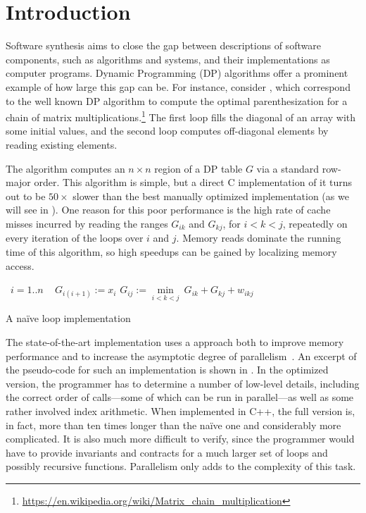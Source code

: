 \section{Introduction}
\label{intro}

\newcommand\ForLine[1]{\State\algorithmicfor~{#1} \algorithmicdo~}
\newcommand\Head[1]{\Comment{ {\it #1} ~~}}

Software synthesis aims to close the gap between descriptions of software components, such as algorithms and systems, and their implementations as computer programs. Dynamic Programming (DP) algorithms offer a prominent example of how large this gap can be. For instance, consider  
\cbstart{}%
, which correspond to the well known DP algorithm to compute the optimal parenthesization for a chain of matrix multiplications.\footnote{\fontsize{6}{6}\selectfont\url{https://en.wikipedia.org/wiki/Matrix_chain_multiplication}}
The first loop fills the diagonal of an array with some initial values,
and the second loop computes off-diagonal elements by reading existing elements.
\cbend

The algorithm computes an $n\times n$ region of a DP table $G$ via a standard row-major order. This algorithm is simple, but a direct C implementation of it turns out to be 
$50\times$ slower than the best manually optimized implementation \cbstart(as we will see in )\cbend. 
One reason for this poor performance is the high rate of cache misses incurred by reading the ranges $G_{ik}$ and $G_{kj}$, for $i<k<j$, repeatedly on every iteration of the loops over $i$ and $j$. Memory reads dominate the running time of this algorithm, so high speedups can be gained by localizing memory access.


\begin{algorithm}[t]
\renewcommand\arraystretch{1.3}
\begin{algorithmic}
  \ForLine{$i=1..n$}  $G_{i(i+1)} := x_i$    \Head{Initialize}
            \Head{Compute}
      \State $G_{ij} := \underset{i<k<j}\min ~ G_{ik} + G_{kj} + w_{ikj}$
    \EndFor
  \EndFor
\end{algorithmic}
\caption{\label{intro:naive}
   A na\"ive loop implementation}
\end{algorithm}


The state-of-the-art implementation uses a  approach both to improve memory performance and to increase the asymptotic degree of parallelism~\cite{IPDPS15/Tithi}. An excerpt of the pseudo-code for such an implementation is shown in . In the optimized version, the programmer has to determine a number of low-level details, including the correct order of calls---some of which can be run in parallel---as well as some rather involved index arithmetic. When implemented in C++, the full version is, in fact, more than ten times longer than the na\"ive one and considerably more complicated. It is also much more difficult to verify, since the programmer would have to provide invariants and contracts for a much larger set of loops and possibly recursive functions. Parallelism only adds to the complexity of this task.



